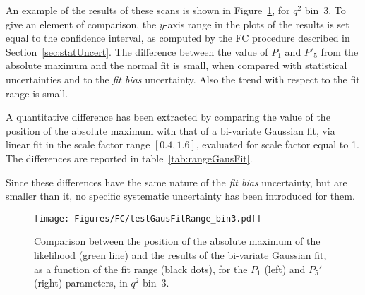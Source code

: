 An example of the results of these scans is shown in Figure~\ref{fig:gausFitRange}, for $q^2$ bin~3.
To give an element of comparison, the $y$-axis range in the plots of the results is set equal to the confidence interval, as computed by the FC procedure described in Section~\ref{sec:statUncert}. 
The difference between the value of $P_1$ and $P'_5$ from the absolute maximum and the normal fit is small, when compared with statistical uncertainties and to the \textit{fit bias} uncertainty.
Also the trend with respect to the fit range is small.

A quantitative difference has been extracted by comparing the value of the position of the absolute maximum with that of a bi-variate Gaussian fit, via linear fit in the scale factor range $[0.4,1.6]$, evaluated for scale factor equal to 1.
The differences are reported in table~\ref{tab:rangeGausFit}.

Since these differences have the same nature of the \textit{fit bias} uncertainty, but are smaller than it, no specific systematic uncertainty has been introduced for them. 

\begin{figure}
  \centering
  \texttt{[image: Figures/FC/testGausFitRange\_bin3.pdf]}
  \caption{Comparison between the position of the absolute maximum of the likelihood (green line) and the results of the bi-variate Gaussian fit, as a function of the fit range (black dots), for the $P_1$ (left) and $P_5'$ (right) parameters, in $q^2$ bin~3.
  }
  \label{fig:gausFitRange}
\end{figure}

